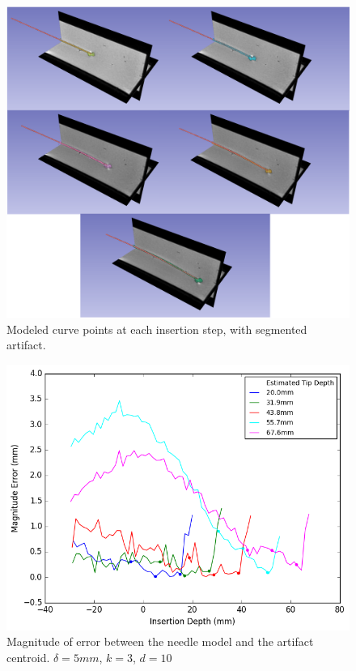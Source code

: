 \begin{figure}[h]
\includegraphics[width=1.0\textwidth]{Fig/chap5/insertions.png}
\caption{Modeled curve points at each insertion step, with segmented artifact.}
\label{fig:curve_points}
\end{figure}

\begin{figure}[h]
\includegraphics[width=1.0\textwidth]{Fig/chap5/error_curve_3_10.png}
\caption{Magnitude of error between the needle model and the artifact centroid. $\delta=5mm$, $k=3$, $d=10$}
\label{fig:curve_errors_fixed_spacing}
\end{figure}

